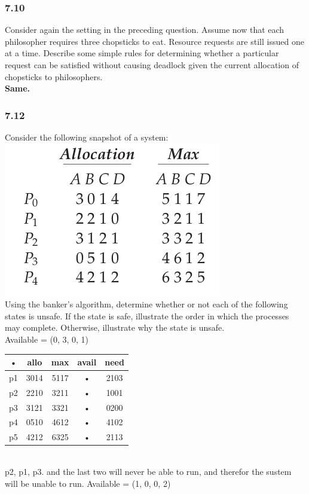 \documentclass[a4paper,10pt,titlepage]{report}
\begin{document}
\subsubsection{7.10} Consider again the setting in the preceding question. Assume now that each philosopher requires three chopsticks to eat. Resource requests are still issued one at a time. Describe some simple rules for determining whether a particular request can be satisfied without causing deadlock given the current allocation of chopsticks to philosophers.\\
\textbf{Same.}



\subsubsection{7.12} Consider the following snapshot of a system: 
\\
\includegraphics[scale=0.5]{ex-7_12.png}
\\
Using the banker's algorithm, determine whether or not each of the following states is unsafe. If the state is safe, illustrate the order in which the processes may complete. Otherwise, illustrate why the state is unsafe.\\
Available = (0, 3, 0, 1)\\
\begin{tabular}{|c|c|c|c|c|}
\hline 
• & allo & max & avail & need \\ 
\hline 
p1 & 3014 & 5117 & • & 2103 \\ 
\hline 
p2 & 2210 & 3211 & • & 1001 \\ 
\hline 
p3 & 3121 & 3321 & • & 0200 \\ 
\hline 
p4 & 0510 & 4612 & • & 4102 \\ 
\hline 
p5 & 4212 & 6325 & • & 2113 \\ 
\hline 
\end{tabular} \\
p2, p1, p3. and the last two will never be able to run, and therefor the sustem will be unable to run.
Available = (1, 0, 0, 2)\\
\end{document}
